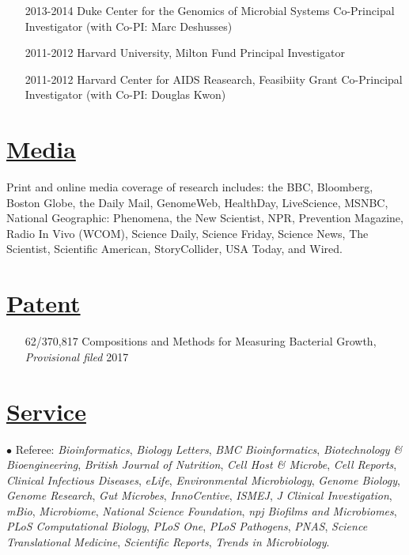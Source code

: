 \documentclass[overlapped,line,11pt]{res}
\begin{document}
\begin{resume}
\begin{itemize}[leftmargin=2cm, style=sameline]
\item[2013-2014] Duke Center for the Genomics of Microbial Systems
  \newline Co-Principal Investigator (with Co-PI:
  Marc Deshusses)

\item[2011-2012] Harvard University, Milton Fund \newline
  Principal Investigator

\item[2011-2012] Harvard Center for AIDS Reasearch, Feasibiity Grant \newline
  Co-Principal Investigator (with Co-PI: Douglas Kwon)

\end{itemize}

\section{\underline{\sc Media}} 
\vspace{.05in} Print and online media coverage of research includes:
the BBC, Bloomberg, Boston Globe, the Daily Mail, GenomeWeb,
HealthDay, LiveScience, MSNBC, National Geographic: Phenomena, the New
Scientist, NPR, Prevention Magazine, Radio In Vivo (WCOM), Science
Daily, Science Friday, Science News, The Scientist, Scientific
American, StoryCollider, USA Today, and Wired.

\section{\underline{\sc Patent}} 
\vspace{.25in} 
\begin{itemize}[leftmargin=2cm, style=sameline, itemsep=0mm]
\item[62/370,817] Compositions and Methods for Measuring Bacterial Growth, \emph{Provisional filed} 2017
\end{itemize}


\section{\underline{\sc Service}}
\vspace{.05in}

\hangindent=0.5in $\bullet$\hspace{.1in} Referee:
\emph{Bioinformatics}, \emph{Biology Letters}, \emph{BMC
  Bioinformatics}, \emph{Biotechnology \& Bioengineering},
\emph{British Journal of Nutrition}, \emph{Cell
  Host \& Microbe}, \emph{Cell Reports}, \emph{Clinical Infectious
  Diseases}, \emph{eLife}, \emph{Environmental Microbiology},
\emph{Genome Biology}, \emph{Genome Research}, \emph{Gut Microbes},
\emph{InnoCentive}, \emph{ISMEJ}, \emph{J Clinical Investigation},
\emph{mBio}, \emph{Microbiome}, \emph{National Science Foundation},
\emph{npj Biofilms and Microbiomes}, \emph{PLoS Computational
  Biology}, \emph{PLoS One}, \emph{PLoS Pathogens}, \emph{PNAS},
\emph{Science Translational Medicine}, \emph{Scientific Reports},
\emph{Trends in Microbiology}. \\


\end{resume}
\end{document}
